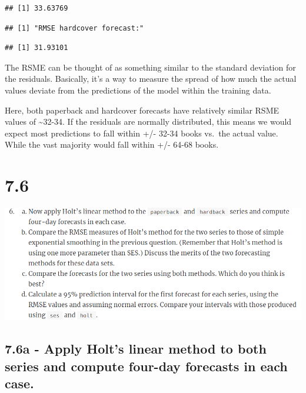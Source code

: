 \documentclass[]{book}
\newenvironment{Shaded}{\begin{snugshade}}{\end{snugshade}}
\newcommand{\KeywordTok}[1]{\textcolor[rgb]{0.13,0.29,0.53}{\textbf{#1}}}
\newcommand{\NormalTok}[1]{#1}
\newcommand{\OperatorTok}[1]{\textcolor[rgb]{0.81,0.36,0.00}{\textbf{#1}}}
\begin{document}
\begin{verbatim}
## [1] 33.63769
\end{verbatim}

\begin{verbatim}
## [1] "RMSE hardcover forecast:"
\end{verbatim}

\begin{Shaded}
\end{Shaded}

\begin{verbatim}
## [1] 31.93101
\end{verbatim}

The RSME can be thought of as something similar to the standard deviation for the residuals. Basically, it's a way to measure the spread of how much the actual values deviate from the predictions of the model within the training data.

Here, both paperback and hardcover forecasts have relatively similar RSME values of \textasciitilde{}32-34. If the residuals are normally distributed, this means we would expect most predictions to fall within +/- 32-34 books vs.~the actual value. While the vast majority would fall within +/- 64-68 books.

\hypertarget{section-10}{%
\section{7.6}\label{section-10}}

\includegraphics{./week4/7.6.png}

\hypertarget{a---apply-holts-linear-method-to-both-series-and-compute-four-day-forecasts-in-each-case.}{%
\subsection{7.6a - Apply Holt's linear method to both series and compute four-day forecasts in each case.}\label{a---apply-holts-linear-method-to-both-series-and-compute-four-day-forecasts-in-each-case.}}
\end{document}
